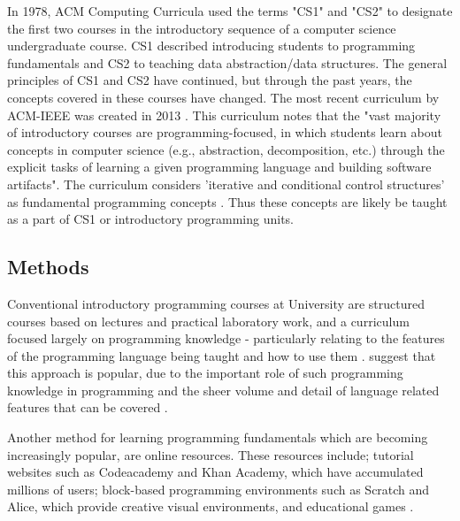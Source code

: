\documentclass[a4paper,11.5pt]{report}
\numberwithin{figure}{section}
\numberwithin{table}{section}
\numberwithin{equation}{section}
\numberwithin{equation}{section}
\begin{document}
In 1978, ACM Computing Curricula used the terms "CS1" and "CS2" to designate the first two courses in the introductory sequence of a computer science undergraduate course. CS1 described introducing students to programming fundamentals and CS2 to teaching data abstraction/data structures. The general principles of CS1 and CS2 have continued, but through the past years, the concepts covered in these courses have changed. The most recent curriculum by ACM-IEEE was created in 2013 \citep{Hertz2010}. This curriculum notes that the "vast majority of introductory courses are programming-focused, in which students learn about concepts in computer science (e.g., abstraction, decomposition, etc.) through the explicit tasks of learning a given programming language and building software artifacts". The curriculum considers 'iterative and conditional control structures' as fundamental programming concepts \citep{acm}. Thus these concepts are likely be taught as a part of CS1 or introductory programming units. %


\subsection{Methods}

Conventional introductory programming courses at University are structured courses based on lectures and practical laboratory work, and a curriculum focused largely on programming knowledge - particularly relating to the features of the programming language being taught and how to use them \citep{Robins2003}. \citeauthor{Robins2003} suggest that this approach is popular, due to the important role of such programming knowledge in programming and the sheer volume and detail of language related features that can be covered \citep{Robins2003}.

Another method for learning programming fundamentals which are becoming increasingly popular, are online resources. These resources include; tutorial websites such as Codeacademy and Khan Academy, which have accumulated millions of users; block-based programming environments such as Scratch and Alice, which provide creative visual environments, and educational games \citep{Lee2015}. 
\end{document}
